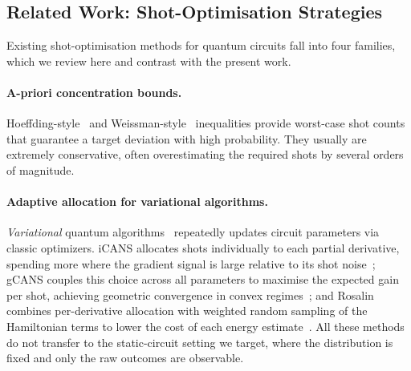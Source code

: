 \documentclass[runningheads]{llncs}
\begin{document}
\subsection{Related Work: Shot-Optimisation Strategies}
\label{sec:relwork}

Existing shot-optimisation methods for quantum circuits fall into four families,
which we review here and contrast with the present work.

\paragraph{A-priori concentration bounds.} Hoeffding-style~\cite{hoeffding1963}
and Weissman-style~\cite{weissman2003inequalities} inequalities provide
worst-case shot counts that guarantee a target deviation with high probability.
They usually are
extremely conservative, often overestimating the required shots by several
orders of magnitude.

\paragraph{Adaptive allocation for variational algorithms.} \emph{Variational} quantum
algorithms~\cite{cerezo2021vqa,kandala2017vqe} repeatedly updates circuit parameters via classic optimizers. iCANS allocates shots individually to each partial
derivative, spending more where the gradient signal is large relative to its
shot noise~\cite{kubler2020icans}; gCANS couples this choice across all
parameters to maximise the expected gain per shot, achieving geometric
convergence in convex regimes~\cite{gu2021gcans}; and Rosalin combines
per-derivative allocation with weighted random sampling of the Hamiltonian terms
to lower the cost of each energy estimate~\cite{arrasmith2020rosalin}. 
All these methods do not transfer to the static-circuit
setting we target, where the distribution is fixed and only the raw outcomes are
observable. 
\end{document}
